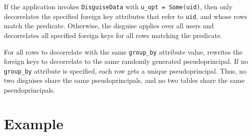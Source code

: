 %
If the application invokes \texttt{DisguiseData} with \texttt{u\_opt = Some(uid)}, then \sys only decorrelates the specified
foreign key attributes that refer to \texttt{uid}, and whose
rows match the predicate. 
%
Otherwise, the disguise applies over all users and \sys decorrelates all
specified foreign keys for all rows matching the predicate.
%

%
For all rows to decorrelate with the same \texttt{group\_by} attribute value,
\sys rewrites the foreign keys to decorrelate to the same randomly generated
pseudoprincipal.
%
If no \texttt{group\_by} attribute is specified, each row gets a unique
pseudoprincipal.
%
Thus, no two disguises share the same pseudoprincipals, and no two tables share
the same pseudoprincipals.
%

\section{Example}
 \label{s:semantics:example}  
%
